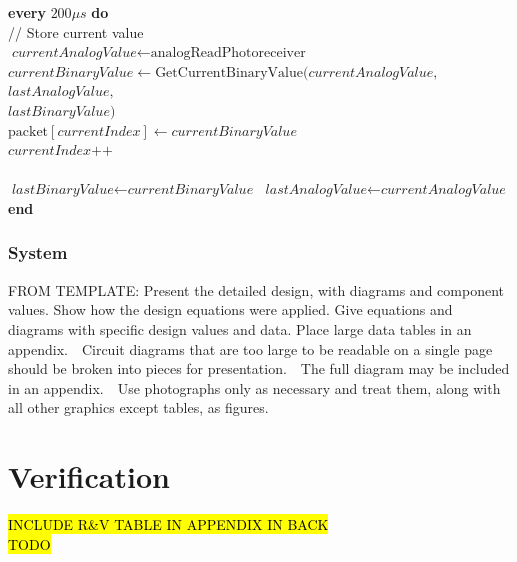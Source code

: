 \documentclass[letterpaper,10pt]{article}
\begin{document}
\begin{spacing}{1.15}
\begin{algorithm}[H]
\begin{algorithmic}[1]
		\State \textbf{every} $200 \mu s$ \textbf{do}\\
		\quad // Store current value\\
		\quad $\textit{currentAnalogValue} \gets \text{analogReadPhotoreceiver}$\\
		\quad $\textit{currentBinaryValue} \gets \text{GetCurrentBinaryValue}(\textit{currentAnalogValue},$\\ 
		\hspace{7.65cm} $\textit{lastAnalogValue},$\\
		\hspace{7.65cm} $\textit{lastBinaryValue})$ \\
		\quad $\text{packet}[\textit{currentIndex}] \gets \textit{currentBinaryValue}$\\
		\quad $\textit{currentIndex}\text{++}$\\\\
		
		\State \quad $\textit{lastBinaryValue} \gets \textit{currentBinaryValue}$
		\State \quad $\textit{lastAnalogValue} \gets \textit{currentAnalogValue}$
		\State \textbf{end}		
	\end{algorithmic}
\end{algorithm}
\subsubsection{System}

FROM TEMPLATE: Present the detailed design, with diagrams and component values. Show how the design equations were applied. Give equations and diagrams with specific design values and data. Place large data tables in an appendix.  Circuit diagrams that are too large to be readable on a single page should be broken into pieces for presentation.  The full diagram may be included in an appendix.  Use photographs only as necessary and treat them, along with all other graphics except tables, as figures.


\section{Verification}
\hl{INCLUDE R\&V TABLE IN APPENDIX IN BACK}
\\ \hl{TODO}


\end{spacing}
\end{document}

